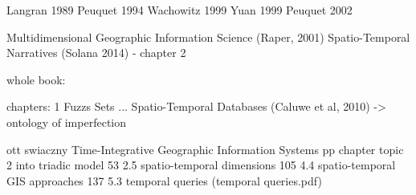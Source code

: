 
Langran 1989
Peuquet 1994
Wachowitz 1999
Yuan 1999
Peuquet 2002




Multidimensional Geographic Information Science (Raper, 2001)
\cite{raper2000multidimensional}
Spatio-Temporal Narratives (Solana 2014) - chapter 2

whole book:
\cite{Langran1989timeingis}

chapters:
1 Fuzzs Sets ...
Spatio-Temporal Databases (Caluwe et al, 2010)
-> ontology of imperfection
\cite{deCaluwe:2010:SDF:1965517}


ott swiaczny
Time-Integrative Geographic Information Systems
pp  chapter   topic
2   into      triadic model
53  2.5       spatio-temporal dimensions
105 4.4       spatio-temporal GIS approaches
137 5.3       temporal queries  (temporal queries.pdf)




